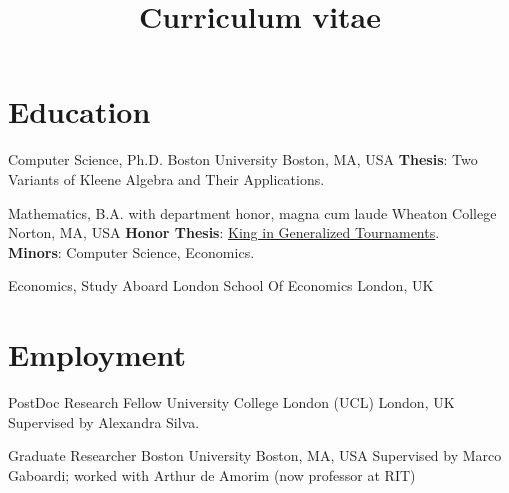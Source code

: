 \documentclass[10pt]{moderncv}        %
\title{Curriculum vitae}
\let\oldsection=\section
\renewcommand{\section}{%
  \needspace{\baselineskip}
  \oldsection
}
\begin{document}

\makecvtitle{}

\setlength{\parskip}{2.5px}
\linespread{1.3}
\selectfont


\section{Education}

{Computer Science, Ph.D.} {}
{Boston University}
{Boston, MA, USA}
{\textbf{Thesis}: Two Variants of Kleene Algebra and Their Applications.}  %





{Mathematics, B.A.} {with department honor, magna cum laude}
{Wheaton College}
{Norton, MA, USA}
{\textbf{Honor Thesis}: \href{http://hdl.handle.net/11040/24570}{King in Generalized Tournaments}.\\
\textbf{Minors}: Computer Science, Economics.
}

{Economics, Study Aboard} {}
{London School Of Economics}
{London, UK}
{}  %

\section{Employment}

{PostDoc Research Fellow}
{University College London (UCL)}
{London, UK}{}
{Supervised by Alexandra Silva.}

{Graduate Researcher}
{Boston University}
{Boston, MA, USA}{}
{
Supervised by Marco Gaboardi; worked with Arthur de Amorim (now professor at RIT)
}
\end{document}
